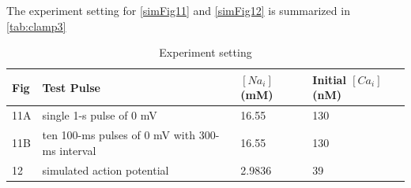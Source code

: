 \documentclass[fleqn,10pt]{physiome}
\begin{document}
The experiment setting for \autoref{simFig11} and \autoref{simFig12} is summarized in \autoref{tab:clamp3}

\begin{table}[hbt!]\centering
\caption{Experiment setting}\label{tab:clamp3}
\begin{tabularx}{\textwidth}{m{1cm}m{7.2cm}m{2cm}X}
\toprule
Fig &  Test Pulse& $[Na_i]$ (mM) & Initial $[Ca_i]$ (nM)\\
\midrule
11A & single 1-s pulse of 0 mV & 16.55 & 130 \\
11B & ten 100-ms pulses of 0 mV with 300-ms interval & 16.55 & 130\\
12 & simulated action potential & 2.9836 & 39\\
\bottomrule
\end{tabularx}
\end{table}
\end{document}
